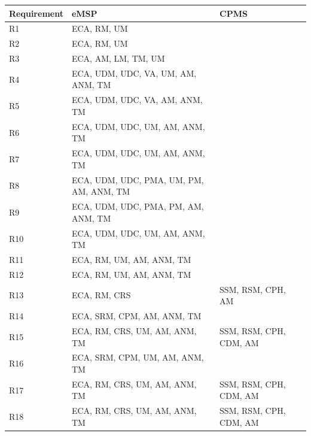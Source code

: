 \documentclass{Configuration_Files/PoliMi3i_thesis}
\begin{document}
\begin{xltabular}{\textwidth}{| >{}l | X | X |}
\hline
{}
    \textbf{Requirement} & \textbf{eMSP}& \textbf{CPMS}\T\B\\
\hline

R1 & ECA, RM, UM & \B\\
\hline
 
R2 & ECA, RM, UM & \B\\
\hline

R3 & ECA, AM, LM, TM, UM & \B\\
\hline

R4 & ECA, UDM, UDC, VA, UM, AM, ANM, TM & \B\\
\hline

R5 & ECA, UDM, UDC, VA, AM, ANM, TM & \B\\
\hline

R6 & ECA, UDM, UDC, UM, AM, ANM, TM & \B\\
\hline

R7 & ECA, UDM, UDC, UM, AM, ANM, TM & \B\\
\hline

R8 & ECA, UDM, UDC, PMA, UM, PM, AM, ANM, TM & \B\\
\hline

R9 & ECA, UDM, UDC, PMA, PM, AM, ANM, TM & \B\\
\hline

R10 & ECA, UDM, UDC, UM, AM, ANM, TM & \B\\
\hline

R11 & ECA, RM, UM, AM, ANM, TM & \B\\
\hline

R12 & ECA, RM, UM, AM, ANM, TM & \B\\
\hline

R13 & ECA, RM, CRS & SSM, RSM, CPH, AM \B\\
\hline

R14 & ECA, SRM, CPM, AM, ANM, TM & \B\\
\hline

R15 & ECA, RM, CRS, UM, AM, ANM, TM & SSM, RSM, CPH, CDM, AM \B\\
\hline
  
R16 & ECA, SRM, CPM, UM, AM, ANM, TM & \B\\
\hline

R17 & ECA, RM, CRS, UM, AM, ANM, TM & SSM, RSM, CPH, CDM, AM \B\\
\hline

R18 & ECA, RM, CRS, UM, AM, ANM, TM & SSM, RSM, CPH, CDM, AM \B\\
\hline
  

\end{xltabular}
\end{document}
